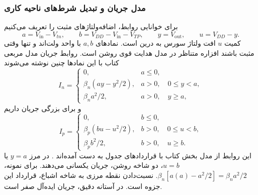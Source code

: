 \subsubsection{مدل جریان و تبدیل شرط‌های ناحیه کاری}
\label{sec:inverter-regions}
برای خوانایی روابط، اضافه‌ولتاژهای مثبت را تعریف می‌کنیم
\begin{equation}
 a=V_{\mathrm{in}}-V_{tn},\qquad
 b=V_{DD}-V_{\mathrm{in}}-V_{TP},\qquad
 y=V_{\mathrm{out}},\qquad u=V_{DD}-y.
 \label{eq:inverter-ab-definitions}
\end{equation}
کمیت \(u\) افت ولتاژ سورس به درین  است. نمادهای
\(a,b\) با واحد ولت‌اند و تنها وقتی مثبت باشند افزاره متناظر
در مدل هدایت قوی روشن است. روابط جریان مدل مربعی کتاب با این
نمادها چنین نوشته می‌شوند
\begin{equation}
 I_n=
 \begin{cases}
 0,&a\le0,\\[2pt]
 \beta_n(ay-y^2/2),&a>0,\quad 0\le y<a,\\[2pt]
 \beta_n a^2/2,&a>0,\quad y\ge a,
 \end{cases}
 \label{eq:inverter-n-current}
\end{equation}
و برای بزرگی جریان  داریم
\begin{equation}
 I_p=
 \begin{cases}
 0,&b\le0,\\[2pt]
 \beta_p(bu-u^2/2),&b>0,\quad 0\le u<b,\\[2pt]
 \beta_p b^2/2,&b>0,\quad u\ge b.
 \end{cases}
 \label{eq:inverter-p-current}
\end{equation}
این روابط از مدل بخش  کتاب با قراردادهای جدول
 به دست آمده‌اند \cite[صفحات ۶۶ و ۸۸]{weste}.
در مرز \(y=a\) یا \(u=b\)، دو شاخه روشن، جریان یکسانی می‌دهند.
برای نمونه، \(\beta_n[a(a)-a^2/2]=\beta_na^2/2\).
نسبت‌دادن نقطه مرزی به شاخه اشباع، قرارداد این جزوه است.
در آستانه دقیق، جریان ایده‌آل صفر است.


